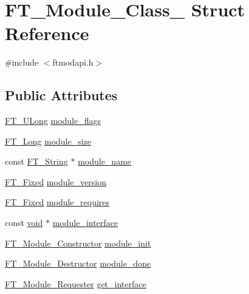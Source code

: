 \hypertarget{struct_f_t___module___class__}{}\section{F\+T\+\_\+\+Module\+\_\+\+Class\+\_\+ Struct Reference}
\label{struct_f_t___module___class__}


{\ttfamily \#include $<$ftmodapi.\+h$>$}

\subsection*{Public Attributes}
\begin{DoxyCompactItemize}
\item 
\mbox{\hyperlink{fttypes_8h_a4fac88bdba78eb76b505efa6e4fbf3f5}{F\+T\+\_\+\+U\+Long}} \mbox{\hyperlink{struct_f_t___module___class___a54a02a3767955cd8fa0cd786bd1f9515}{module\+\_\+flags}}
\item 
\mbox{\hyperlink{fttypes_8h_a7fa72a1f0e79fb1860c5965789024d6f}{F\+T\+\_\+\+Long}} \mbox{\hyperlink{struct_f_t___module___class___a2582eeab364e4fbbd5d1e420bfcf3207}{module\+\_\+size}}
\item 
const \mbox{\hyperlink{fttypes_8h_a9846214585359eb2ba6bbb0e6de30639}{F\+T\+\_\+\+String}} $\ast$ \mbox{\hyperlink{struct_f_t___module___class___af25b9e32b6c91e0c31560efb62886ed7}{module\+\_\+name}}
\item 
\mbox{\hyperlink{fttypes_8h_a5f5a679cc09f758efdd0d1c5feed3c3d}{F\+T\+\_\+\+Fixed}} \mbox{\hyperlink{struct_f_t___module___class___a5b649f1965c42fd8c54bbc370fbf60b4}{module\+\_\+version}}
\item 
\mbox{\hyperlink{fttypes_8h_a5f5a679cc09f758efdd0d1c5feed3c3d}{F\+T\+\_\+\+Fixed}} \mbox{\hyperlink{struct_f_t___module___class___a24772981bd972d342f54a6e1704f85c3}{module\+\_\+requires}}
\item 
const \mbox{\hyperlink{_s_d_l__opengles2__gl2ext_8h_ae5d8fa23ad07c48bb609509eae494c95}{void}} $\ast$ \mbox{\hyperlink{struct_f_t___module___class___a320168f227e2d268691429ac0c6b2900}{module\+\_\+interface}}
\item 
\mbox{\hyperlink{ftmodapi_8h_ae0a0ec80683e4845d953fcbb7e6af093}{F\+T\+\_\+\+Module\+\_\+\+Constructor}} \mbox{\hyperlink{struct_f_t___module___class___a60f2bb9eee68366f20fe0613f347ffbd}{module\+\_\+init}}
\item 
\mbox{\hyperlink{ftmodapi_8h_a7881ad6a13b0fe28b8473fa7ee6f28c2}{F\+T\+\_\+\+Module\+\_\+\+Destructor}} \mbox{\hyperlink{struct_f_t___module___class___ab6e9c780519e24a51144df79692cf339}{module\+\_\+done}}
\item 
\mbox{\hyperlink{ftmodapi_8h_af078ba2b906d2553add818593ab784ed}{F\+T\+\_\+\+Module\+\_\+\+Requester}} \mbox{\hyperlink{struct_f_t___module___class___aa72d79fcd0991231e24e88f359244e8e}{get\+\_\+interface}}
\end{DoxyCompactItemize}


